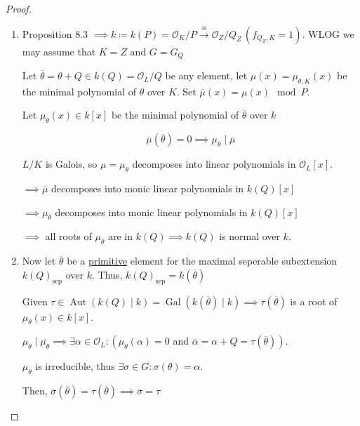 \documentclass[openany]{amsbook}
\numberwithin{section}{chapter}
\theoremstyle{definition}
\begin{document}
\begin{proof}
    \begin{enumerate}[label=\arabic*)]
        \item Proposition 8.3 \(\implies k \coloneqq k(P) = \mathcal{O}_K / P \overset{\cong}{\to} \mathcal{O}_Z / Q_Z \, (f_{Q_Z,K}=1)\). WLOG we may assume that \(K = Z\) and \(G = G_Q\)
        
        Let \(\overline{\theta} = \theta + Q \in k(Q) = \mathcal{O}_L / Q\) be any element, let \(\mu(x) = \mu_{\theta , K}(x)\) be the minimal polynomial of \(\theta\) over \(K\). Set \(\overline{\mu } (x) = \mu (x) \mod P\).

        Let \(\mu_{\overline{\theta }}(x) \in k[x]  \) be the minimal polynomial of \(\overline{\theta } \) over \(k\) 
        
        \[
            \overline{\mu} (\overline{\theta } ) = 0 \implies \mu _{\overline{\theta } } \mid \overline{\mu} 
        \]

        \(L / K\) is Galois, so \(\mu = \mu_\theta\) decomposes into linear polynomials in \(\mathcal{O}_L [x]\). 

        \(\implies \overline{\mu} \) decomposes into monic linear polynomials in \(k(Q)[x]\) 
        
        \(\implies \mu_{\overline{\theta} }\) decomposes into monic linear polynomials in \(k(Q)[x]\)

        \(\implies\) all roots of \(\mu_{\overline{\theta} }\) are in \(k(Q) \implies k(Q)\) is normal over \(k\).

        \item Now let \(\overline{\theta}\) be a \underline{primitive} element for the maximal seperable subextension \(k(Q)_{\text{sep}}\) over \(k\). Thus, \(k(Q)_{\text{sep}} = k(\overline{\theta} )\)
        
        Given \(\tau \in \operatorname{Aut}(k(Q) \mid k) = \operatorname{Gal} (k(\overline{\theta})\mid k) \implies \tau (\overline{\theta})\) is a root of \(\mu_{\overline{\theta}}(x) \in k[x]\).
        
        \(\mu_{\overline{\theta } } \mid \overline{\mu_\theta} \implies \exists \alpha \in \mathcal{O} _L : (\mu_\theta (\alpha) = 0 \text{ and } \overline{\alpha} = \alpha + Q = \tau (\overline{\theta } ) )\).
        
        \(\mu_\theta\) is irreducible, thus \(\exists \sigma \in G : \sigma (\theta) = \alpha \). 

        Then, \(\overline{\sigma } (\overline{\theta } ) = \tau (\overline{\theta } ) \implies \overline{\sigma } = \tau\) 
    \end{enumerate} 

\end{proof}
\end{document}
